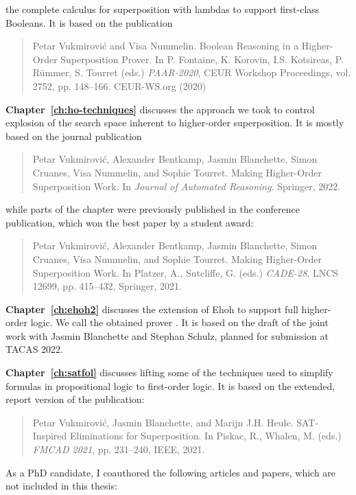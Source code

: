 the complete calculus for superposition with lambdas to support first-class
Booleans. It is based on the publication
    \begin{quote}
      Petar Vukmirović and Visa Nummelin. Boolean Reasoning in a Higher-Order
      Superposition Prover. In P. Fontaine, K. Korovin, I.S. Kotsireas, P.
      R\"ummer, S. Tourret (eds.) \emph{PAAR-2020}, CEUR Workshop Proceedings, vol.
      2752, pp. 148--166. CEUR-WS.org (2020)
    \end{quote}
\noindent\textbf{Chapter~\ref{ch:ho-techniques}} discusses the approach we took to
control explosion of the search space inherent to higher-order superposition. It is mostly based on the journal publication
  \begin{quote}
    Petar Vukmirović, Alexander Bentkamp, Jasmin Blanchette, Simon Cruanes, Visa Nummelin, and Sophie Tourret.
    Making Higher-Order Superposition Work. In \emph{Journal of Automated Reasoning}. Springer, 2022.
  \end{quote}
\vspace{-0.3em}
  while parts of the chapter were previously published in the conference publication, which won the best paper by a student award:
\vspace{-0.3em}
\begin{quote}
  Petar Vukmirović, Alexander Bentkamp, Jasmin Blanchette, Simon Cruanes, Visa Nummelin, and Sophie Tourret.
  Making Higher-Order Superposition Work. In Platzer, A., Sutcliffe, G. (eds.) \emph{CADE-28},
  LNCS 12699, pp. 415--432, Springer, 2021.
\end{quote}
\noindent\textbf{Chapter~\ref{ch:ehoh2}} discusses the extension of Ehoh to
support full higher-order logic. We call the obtained prover \newehoh.
It is based on the draft of the joint work with Jasmin Blanchette and
Stephan Schulz, planned for submission at TACAS 2022.

\vspace{0.5em}
\noindent\textbf{Chapter~\ref{ch:satfol}} discusses lifting some of the techniques used to
simplify formulas in propositional logic to first-order logic. It is based on the extended, report version of the publication:
  \begin{quote}
    Petar Vukmirović, Jasmin Blanchette, and Marijn J.H. Heule. 
    SAT-Inspired Eliminations for Superposition. In Piskac, R., Whalen, M. (eds.) \emph{FMCAD 2021}, pp. 231--240, IEEE, 2021. 
  \end{quote}

As a PhD candidate, I coauthored the following articles and papers, which are not included in this thesis:

